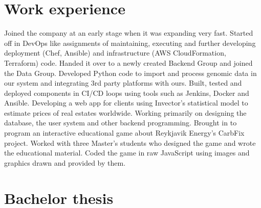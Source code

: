 \documentclass[11pt,a4paper,sans]{moderncv}
\begin{document}
\section{Work experience}
{Joined the company at an early stage when it was expanding very fast.
Started off in DevOps like assignments of maintaining, executing and 
further developing deployment (Chef, Ansible) and infrastructure (AWS 
CloudFormation, Terraform) code. Handed it over to a newly created Backend 
Group and joined the Data Group. Developed Python code to import and process 
genomic data in our system and integrating 3rd party platforms with ours.
Built, tested and deployed components in CI/CD loops using tools such as
Jenkins, Docker and Ansible.}
{Developing a web app for clients using Invector's statistical model to estimate 
prices of real estates worldwide. Working primarily on designing the database, 
the user system and other backend programming.}
{Brought in to program an interactive educational game about Reykjavik Energy's
CarbFix project. Worked with three Master's students who designed the game and
wrote the educational material. Coded the game in raw JavaScript using images
and graphics drawn and provided by them.}

\section{Bachelor thesis}
\end{document}
